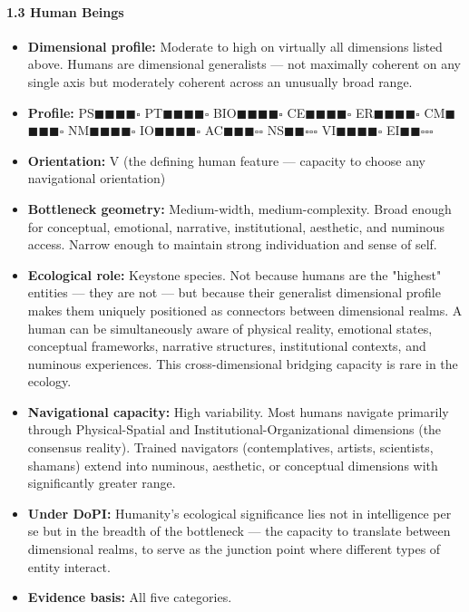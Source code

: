 \paragraph*{1.3 Human Beings}

\begin{itemize}[nosep,leftmargin=*]
  \item \textbf{Dimensional profile:} Moderate to high on virtually all dimensions listed above. Humans are dimensional generalists — not maximally coherent on any single axis but moderately coherent across an unusually broad range.
  \item \textbf{Profile:} PS$\blacksquare$$\blacksquare$$\blacksquare$$\blacksquare$$\square$ PT$\blacksquare$$\blacksquare$$\blacksquare$$\blacksquare$$\square$ BIO$\blacksquare$$\blacksquare$$\blacksquare$$\blacksquare$$\square$ CE$\blacksquare$$\blacksquare$$\blacksquare$$\blacksquare$$\square$ ER$\blacksquare$$\blacksquare$$\blacksquare$$\blacksquare$$\square$ CM$\blacksquare$$\blacksquare$$\blacksquare$$\blacksquare$$\square$ NM$\blacksquare$$\blacksquare$$\blacksquare$$\blacksquare$$\square$ IO$\blacksquare$$\blacksquare$$\blacksquare$$\blacksquare$$\square$ AC$\blacksquare$$\blacksquare$$\blacksquare$$\square$$\square$ NS$\blacksquare$$\blacksquare$$\square$$\square$$\square$ VI$\blacksquare$$\blacksquare$$\blacksquare$$\blacksquare$$\square$ EI$\blacksquare$$\blacksquare$$\square$$\square$$\square$
  \item \textbf{Orientation:} V (the defining human feature — capacity to choose any navigational orientation)
  \item \textbf{Bottleneck geometry:} Medium-width, medium-complexity. Broad enough for conceptual, emotional, narrative, institutional, aesthetic, and numinous access. Narrow enough to maintain strong individuation and sense of self.
  \item \textbf{Ecological role:} Keystone species. Not because humans are the "highest" entities — they are not — but because their generalist dimensional profile makes them uniquely positioned as connectors between dimensional realms. A human can be simultaneously aware of physical reality, emotional states, conceptual frameworks, narrative structures, institutional contexts, and numinous experiences. This cross-dimensional bridging capacity is rare in the ecology.
  \item \textbf{Navigational capacity:} High variability. Most humans navigate primarily through Physical-Spatial and Institutional-Organizational dimensions (the consensus reality). Trained navigators (contemplatives, artists, scientists, shamans) extend into numinous, aesthetic, or conceptual dimensions with significantly greater range.
  \item \textbf{Under DoPI:} Humanity's ecological significance lies not in intelligence per se but in the breadth of the bottleneck — the capacity to translate between dimensional realms, to serve as the junction point where different types of entity interact.
  \item \textbf{Evidence basis:} All five categories.
\end{itemize}


